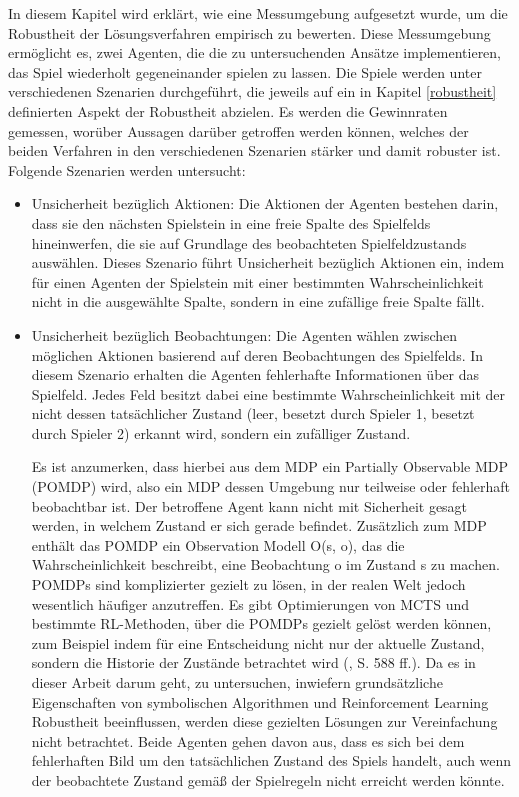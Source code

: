 In diesem Kapitel wird erklärt, wie eine Messumgebung aufgesetzt wurde, um die Robustheit der Lösungsverfahren empirisch zu bewerten. Diese Messumgebung ermöglicht es, zwei Agenten, die die zu untersuchenden Ansätze implementieren, das Spiel wiederholt gegeneinander spielen zu lassen. Die Spiele werden unter verschiedenen Szenarien durchgeführt, die jeweils auf ein in Kapitel \ref{robustheit} definierten Aspekt der Robustheit abzielen. Es werden die Gewinnraten gemessen, worüber Aussagen darüber getroffen werden können, welches der beiden Verfahren in den verschiedenen Szenarien stärker und damit robuster ist. Folgende Szenarien werden untersucht:

\begin{itemize}
	\item Unsicherheit bezüglich Aktionen: Die Aktionen der Agenten bestehen darin, dass sie den nächsten Spielstein in eine freie Spalte des Spielfelds hineinwerfen, die sie auf Grundlage des beobachteten Spielfeldzustands auswählen. Dieses Szenario führt Unsicherheit bezüglich Aktionen ein, indem für einen Agenten der Spielstein mit einer bestimmten Wahrscheinlichkeit nicht in die ausgewählte Spalte, sondern in eine zufällige freie Spalte fällt.
	
	\item Unsicherheit bezüglich Beobachtungen: Die Agenten wählen zwischen möglichen Aktionen basierend auf deren Beobachtungen des Spielfelds. In diesem Szenario erhalten die Agenten fehlerhafte Informationen über das Spielfeld. Jedes Feld besitzt dabei eine bestimmte Wahrscheinlichkeit mit der nicht dessen tatsächlicher Zustand (leer, besetzt durch Spieler 1, besetzt durch Spieler 2) erkannt wird, sondern ein zufälliger Zustand.
	
	Es ist anzumerken, dass hierbei aus dem MDP ein Partially Observable MDP (POMDP) wird, also ein MDP dessen Umgebung nur teilweise oder fehlerhaft beobachtbar ist. Der betroffene Agent kann nicht mit Sicherheit gesagt werden, in welchem Zustand er sich gerade befindet. Zusätzlich zum MDP enthält das POMDP ein Observation Modell O(s, o), das die Wahrscheinlichkeit beschreibt, eine Beobachtung o im Zustand s zu machen. POMDPs sind komplizierter gezielt zu lösen, in der realen Welt jedoch wesentlich häufiger anzutreffen. Es gibt Optimierungen von MCTS und bestimmte RL-Methoden, über die POMDPs gezielt gelöst werden können, zum Beispiel indem für eine Entscheidung nicht nur der aktuelle Zustand, sondern die Historie der Zustände betrachtet wird (\cite{Russell.2020}, S. 588 ff.). Da es in dieser Arbeit darum geht, zu untersuchen, inwiefern grundsätzliche Eigenschaften von symbolischen Algorithmen und Reinforcement Learning Robustheit beeinflussen, werden diese gezielten Lösungen zur Vereinfachung nicht betrachtet. Beide Agenten gehen davon aus, dass es sich bei dem fehlerhaften Bild um den tatsächlichen Zustand des Spiels handelt, auch wenn der beobachtete Zustand gemäß der Spielregeln nicht erreicht werden könnte.
	

\end{itemize}
